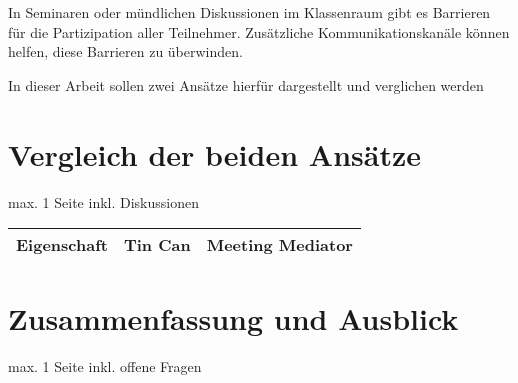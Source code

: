 \documentclass{seminarvorlage}
\begin{document}
In Seminaren oder mündlichen Diskussionen im Klassenraum gibt es Barrieren für
die Partizipation aller Teilnehmer. Zusätzliche Kommunikationskanäle können
helfen, diese Barrieren zu überwinden.

In dieser Arbeit sollen zwei Ansätze hierfür dargestellt und verglichen werden






\section{Vergleich der beiden Ansätze}
max. 1 Seite
inkl. Diskussionen

\begin{tabular}{ l | l | l }
  Eigenschaft & Tin Can & Meeting Mediator \\
  \hline
\end{tabular}


\section{Zusammenfassung und Ausblick}
max. 1 Seite
inkl. offene Fragen
% 
\end{document}
